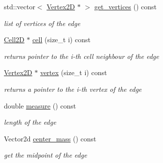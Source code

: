 \begin{DoxyCompactItemize}
\mbox{\label{classHArDCore2D_1_1Edge2D_ad2b7c14cdbb0c590c705326dd26162b1}} 
std\+::vector$<$ \hyperlink{classHArDCore2D_1_1Vertex2D}{Vertex2D} $\ast$ $>$ \hyperlink{classHArDCore2D_1_1Edge2D_ad2b7c14cdbb0c590c705326dd26162b1}{get\+\_\+vertices} () const
\begin{DoxyCompactList}\small\item\em list of vertices of the edge \end{DoxyCompactList}\item 
\mbox{\label{classHArDCore2D_1_1Edge2D_aec9ba58af7a02bd31c4275edde79b5c6}} 
\hyperlink{classHArDCore2D_1_1Cell2D}{Cell2D} $\ast$ \hyperlink{classHArDCore2D_1_1Edge2D_aec9ba58af7a02bd31c4275edde79b5c6}{cell} (size\+\_\+t i) const
\begin{DoxyCompactList}\small\item\em returns pointer to the i-\/th cell neighbour of the edge \end{DoxyCompactList}\item 
\mbox{\label{classHArDCore2D_1_1Edge2D_a20b8b1ab2f6e8ad195c556a7fac02995}} 
\hyperlink{classHArDCore2D_1_1Vertex2D}{Vertex2D} $\ast$ \hyperlink{classHArDCore2D_1_1Edge2D_a20b8b1ab2f6e8ad195c556a7fac02995}{vertex} (size\+\_\+t i) const
\begin{DoxyCompactList}\small\item\em returns a pointer to the i-\/th vertex of the edge \end{DoxyCompactList}\item 
\mbox{\label{classHArDCore2D_1_1Edge2D_a31769e23163cddee4bacfdbd8278095b}} 
double \hyperlink{classHArDCore2D_1_1Edge2D_a31769e23163cddee4bacfdbd8278095b}{measure} () const
\begin{DoxyCompactList}\small\item\em length of the edge \end{DoxyCompactList}\item 
\mbox{\label{classHArDCore2D_1_1Edge2D_a421c56ef905bf37afde949a3bfb75644}} 
Vector2d \hyperlink{classHArDCore2D_1_1Edge2D_a421c56ef905bf37afde949a3bfb75644}{center\+\_\+mass} () const
\begin{DoxyCompactList}\small\item\em get the midpoint of the edge \end{DoxyCompactList}\item 

\end{DoxyCompactItemize}
